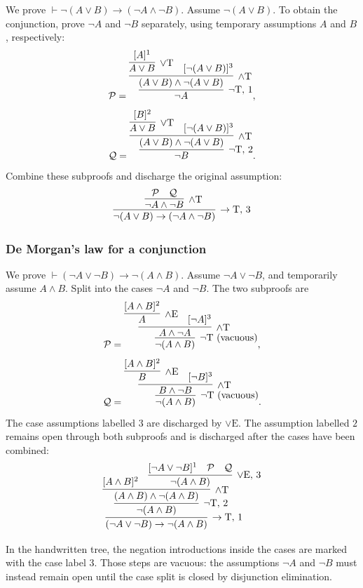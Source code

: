\documentclass[11pt,a4paper]{amsart}
\begin{document}
\begin{example}
  We prove \(\vdash\neg(A\lor B)\to(\neg A\land\neg B)\).
  Assume \(\neg(A\lor B)\). To obtain the conjunction, prove
  \(\neg A\) and \(\neg B\) separately, using temporary assumptions
  \(A\) and \(B\), respectively:
  \[
    \mathcal P =
    \infer[\neg\mathrm T,\,1]{\neg A}{
      \infer[\land\mathrm T]{(A\lor B)\land\neg(A\lor B)}{
        \infer[\lor\mathrm T]{A\lor B}{[A]^1}
    & [\neg(A\lor B)]^3}},
  \]
  \[
    \mathcal Q =
    \infer[\neg\mathrm T,\,2]{\neg B}{
      \infer[\land\mathrm T]{(A\lor B)\land\neg(A\lor B)}{
        \infer[\lor\mathrm T]{A\lor B}{[B]^2}
    & [\neg(A\lor B)]^3}}.
  \]
  Combine these subproofs and discharge the original assumption:
  \[
    \infer[\to\mathrm T,\,3]{\neg(A\lor B)\to(\neg A\land\neg B)}{
    \infer[\land\mathrm T]{\neg A\land\neg B}{\mathcal P & \mathcal Q}}
  \]
\end{example}

\subsubsection{De Morgan's law for a conjunction}

\begin{example}
  We prove \(\vdash(\neg A\lor\neg B)\to\neg(A\land B)\).
  Assume \(\neg A\lor\neg B\), and temporarily assume \(A\land B\).
  Split into the cases \(\neg A\) and \(\neg B\). The two subproofs are
  \[
    \mathcal P =
    \infer[\neg\mathrm T\text{ (vacuous)}]{\neg(A\land B)}{
      \infer[\land\mathrm T]{A\land\neg A}{
    \infer[\land\mathrm E]{A}{[A\land B]^2} & [\neg A]^3}},
  \]
  \[
    \mathcal Q =
    \infer[\neg\mathrm T\text{ (vacuous)}]{\neg(A\land B)}{
      \infer[\land\mathrm T]{B\land\neg B}{
    \infer[\land\mathrm E]{B}{[A\land B]^2} & [\neg B]^3}}.
  \]
  The case assumptions labelled \(3\) are discharged by \(\lor\mathrm E\).
  The assumption labelled \(2\) remains open through both subproofs and
  is discharged after the cases have been combined:
  \[
    \infer[\to\mathrm T,\,1]{(\neg A\lor\neg B)\to\neg(A\land B)}{
      \infer[\neg\mathrm T,\,2]{\neg(A\land B)}{
        \infer[\land\mathrm T]{(A\land B)\land\neg(A\land B)}{
          [A\land B]^2
          & \infer[\lor\mathrm E,\,3]{\neg(A\land B)}{
    [\neg A\lor\neg B]^1 & \mathcal P & \mathcal Q}}}}
  \]
\end{example}

\begin{remark}
  In the handwritten tree, the negation introductions inside the cases
  are marked with the case label \(3\). Those steps are vacuous: the
  assumptions \(\neg A\) and \(\neg B\) must instead remain open until
  the case split is closed by disjunction elimination.
\end{remark}
\end{document}
